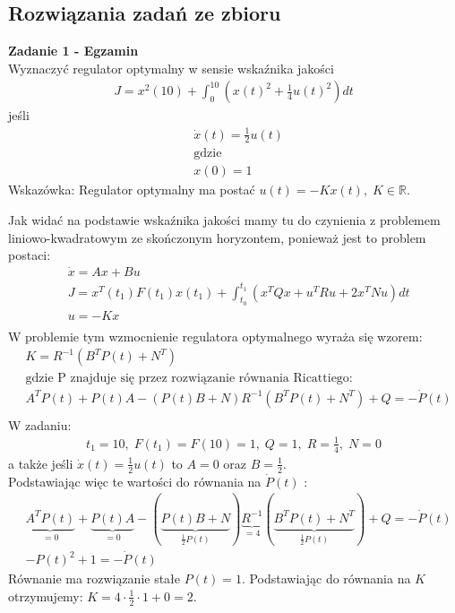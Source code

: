 \documentclass[a4paper,11pt]{article}
\begin{document}
\subsection{Rozwiązania zadań ze zbioru}
\begin{framed}
\textbf{Zadanie 1 - Egzamin } \\ 
Wyznaczyć regulator optymalny w sensie wskaźnika jakości 
\begin{align*}
J = x^2(10) + \int_0^{10}( x(t)^{2}+\frac{1}{4}u(t)^{2}) dt
\end{align*}
jeśli
\begin{align*}
&\dot{x}(t)=\frac{1}{2}u(t) \\
&\text{gdzie} \\
&x(0)= 1 
\end{align*}
Wskazówka: Regulator optymalny ma postać \( u(t) = -Kx(t), \; K \in \mathbb{R} \). 
\end{framed}
Jak widać na podstawie wskaźnika jakości mamy tu do czynienia z problemem liniowo-kwadratowym ze skończonym horyzontem, ponieważ jest to problem postaci:
\begin{align*}
&\dot{x}=Ax+Bu \\
&J=x^T(t_1)F(t_1)x(t_1)+\int_{t_0}^{t_1}(x^T Qx+u^T Ru+2x^T Nu)dt \\
&u = -Kx \\
\end{align*}
W problemie tym wzmocnienie regulatora optymalnego wyraża się wzorem:
\begin{align*}
&K=R^{-1}(B^TP(t)+N^T) \\
&\text{gdzie P znajduje się przez rozwiązanie równania Ricattiego:} \\
&A^TP(t)+P(t)A-(P(t)B+N)R^{-1}(B^TP(t)+N^T)+Q=-\dot{P}(t) \\
\end{align*}
W zadaniu:
\begin{align*}
t_1=10, \;
F(t_1)=F(10)=1, \;
Q=1, \;
R=\frac{1}{4}, \;
N=0
\end{align*}
a także jeśli \( \dot{x}(t)=\frac{1}{2}u(t)  \) to \( A = 0 \) oraz \( B = \frac{1}{2} \). \\ 
Podstawiając więc te wartości do równania na \( \dot{P}(t) \) : 
\begin{align*}
&\underbrace{A^TP(t)}_{=0}+\underbrace{P(t)A}_{=0}-(\underbrace{P(t)B+N}_{\frac{1}{2}P(t)})\underbrace{R^{-1}}_{=4}(\underbrace{B^TP(t)+N^T}_{\frac{1}{2}P(t)})+Q=-\dot{P}(t) \\
&-P(t)^2+1=-\dot{P}(t)
\end{align*}
Równanie ma rozwiązanie stałe \( P(t) = 1 \). 
Podstawiając do równania na \( K \) otrzymujemy: \( K = 4 \cdot \frac{1}{2} \cdot 1 + 0 = 2 \). 
\end{document}
